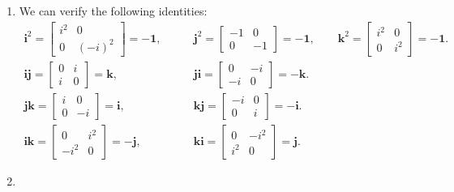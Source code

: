 \documentclass[12pt]{article}
\begin{document}
\begin{enumerate}
\item[a.] {
    We can verify the following identities:
    \begin{align*}
        {\mathbf i}^2 = \begin{bmatrix}
            i^2 & 0 \\ 0 & (-i)^2
        \end{bmatrix} = -\mathbf 1, &\qquad \mathbf{j}^2 = \begin{bmatrix}-1 & 0 \\ 0 & -1\end{bmatrix} = -\mathbf 1, \qquad
        \mathbf{k}^2 = \begin{bmatrix}
            i^2 & 0 \\ 0 & i^2
        \end{bmatrix} = -\mathbf 1. \\
        \mathbf{i}\mathbf{j} = \begin{bmatrix}
            0 & i \\ i & 0
        \end{bmatrix} = \mathbf{k}, &\qquad \mathbf{j}\mathbf{i} = \begin{bmatrix}
            0 & -i \\ -i & 0
        \end{bmatrix} = -\mathbf k. \\
        \mathbf{j}\mathbf{k} = \begin{bmatrix}
            i & 0 \\ 0 & -i
        \end{bmatrix} = \mathbf{i}, &\qquad \mathbf{k}\mathbf{j} = \begin{bmatrix}
            -i & 0 \\ 0 & i
        \end{bmatrix} = -\mathbf i. \\
        \mathbf{i}\mathbf{k} = \begin{bmatrix}
            0 & i^2 \\ -i^2 & 0
        \end{bmatrix} = -\mathbf{j}, &\qquad \mathbf{k}\mathbf{i} = \begin{bmatrix}
            0 & -i^2 \\ i^2 & 0
        \end{bmatrix} = \mathbf j.
    \end{align*}
}
\item[b.] {
}
\end{enumerate}
\end{document}
